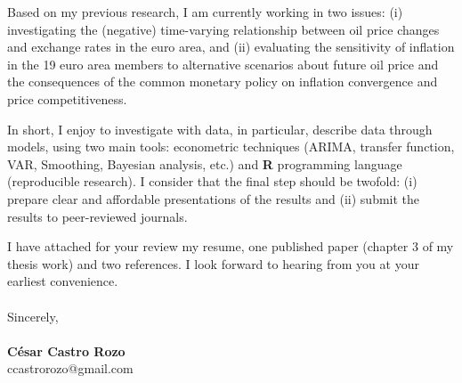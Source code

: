 \documentclass{letter}\usepackage[]{graphicx}\usepackage[]{color}
\begin{document}
{Based on my previous research, I am currently working in two issues: (i) investigating the (negative) time-varying relationship between oil price changes and exchange rates in the euro area, and (ii) evaluating the sensitivity of inflation in the 19 euro area members to alternative scenarios about future oil price and the consequences of the common monetary policy on inflation convergence and price competitiveness.

In short, I enjoy to investigate with data, in particular, describe data through models, using two main tools: econometric techniques (ARIMA, transfer function, VAR, Smoothing, Bayesian analysis, etc.) and \textbf{\textsf{R}} programming language (reproducible research). I consider that the final step should be twofold: (i) prepare clear and affordable presentations of the results and (ii) submit the results to peer-reviewed journals.

I have attached for your review my resume, one published paper (chapter 3 of my thesis work) and two references. I look forward to hearing from you at your earliest convenience.\\
\\
Sincerely,\\
\\
\textbf{César Castro Rozo}\\
ccastrorozo@gmail.com\\

% 
% 
% 

}
\end{document}
